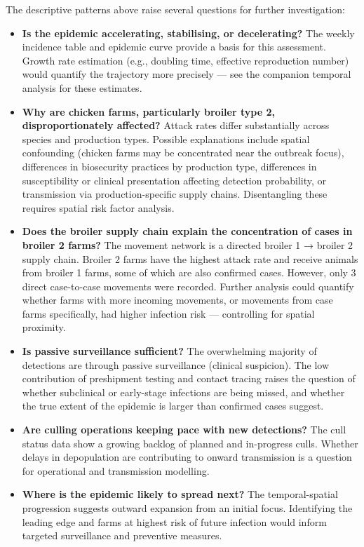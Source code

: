 \documentclass[
]{article}
\begin{document}
The descriptive patterns above raise several questions for further
investigation:

\begin{itemize}
\item
  \textbf{Is the epidemic accelerating, stabilising, or decelerating?}
  The weekly incidence table and epidemic curve provide a basis for this
  assessment. Growth rate estimation (e.g., doubling time, effective
  reproduction number) would quantify the trajectory more precisely ---
  see the companion temporal analysis for these estimates.
\item
  \textbf{Why are chicken farms, particularly broiler type 2,
  disproportionately affected?} Attack rates differ substantially across
  species and production types. Possible explanations include spatial
  confounding (chicken farms may be concentrated near the outbreak
  focus), differences in biosecurity practices by production type,
  differences in susceptibility or clinical presentation affecting
  detection probability, or transmission via production-specific supply
  chains. Disentangling these requires spatial risk factor analysis.
\item
  \textbf{Does the broiler supply chain explain the concentration of
  cases in broiler 2 farms?} The movement network is a directed broiler
  1 → broiler 2 supply chain. Broiler 2 farms have the highest attack
  rate and receive animals from broiler 1 farms, some of which are also
  confirmed cases. However, only 3 direct case-to-case movements were
  recorded. Further analysis could quantify whether farms with more
  incoming movements, or movements from case farms specifically, had
  higher infection risk --- controlling for spatial proximity.
\item
  \textbf{Is passive surveillance sufficient?} The overwhelming majority
  of detections are through passive surveillance (clinical suspicion).
  The low contribution of preshipment testing and contact tracing raises
  the question of whether subclinical or early-stage infections are
  being missed, and whether the true extent of the epidemic is larger
  than confirmed cases suggest.
\item
  \textbf{Are culling operations keeping pace with new detections?} The
  cull status data show a growing backlog of planned and in-progress
  culls. Whether delays in depopulation are contributing to onward
  transmission is a question for operational and transmission modelling.
\item
  \textbf{Where is the epidemic likely to spread next?} The
  temporal-spatial progression suggests outward expansion from an
  initial focus. Identifying the leading edge and farms at highest risk
  of future infection would inform targeted surveillance and preventive
  measures.
\end{itemize}
\end{document}
